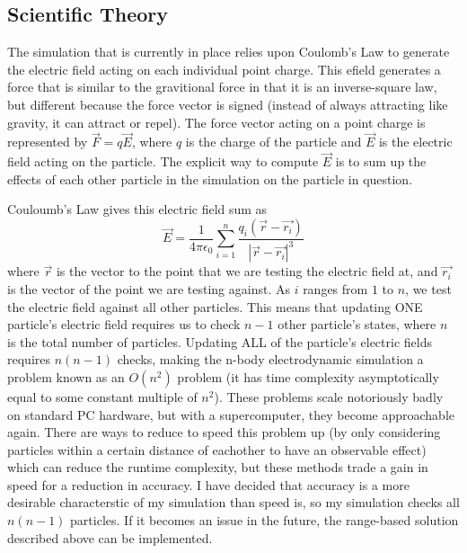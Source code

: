 \documentclass[10pt]{article}
\begin{document}
\clearpage
\subsection{Scientific Theory}
The simulation that is currently in place relies upon Coulomb's Law to generate the electric field acting on each individual point charge. This efield generates a force that is similar to the gravitional force in that it is an inverse-square law, but different because the force vector is signed (instead of always attracting like gravity, it can attract or repel). The force vector acting on a point charge is represented by $\vec{F} = q\vec{E}$, where $q$ is the charge of the particle and $\vec{E}$ is the electric field acting on the particle. The explicit way to compute $\vec{E}$ is to sum up the effects of each other particle in the simulation on the particle in question.

Couloumb's Law gives this electric field sum as $$\vec{E} = \frac{1}{4\pi\epsilon_0}\sum_{i = 1}^n \frac{q_i (\vec{r} - \vec{r_i})}{|\vec{r} - \vec{r_i}|^3}$$ where $\vec{r}$ is the vector to the point that we are testing the electric field at, and $\vec{r_i}$ is the vector of the point we are testing against. As $i$ ranges from $1$ to $n$, we test the electric field against all other particles. This means that updating ONE particle's electric field requires us to check $n-1$ other particle's states, where $n$ is the total number of particles. Updating ALL of the particle's electric fields requires $n(n-1)$ checks, making the n-body electrodynamic simulation a problem known as an $O(n^2)$ problem (it has time complexity asymptotically equal to some constant multiple of $n^2$). These problems scale notoriously badly on standard PC hardware, but with a supercomputer, they become approachable again. There are ways to reduce to speed this problem up (by only considering particles within a certain distance of eachother to have an observable effect) which can reduce the runtime complexity, but these methods trade a gain in speed for a reduction in accuracy. I have decided that accuracy is a more desirable characterstic of my simulation than speed is, so my simulation checks all $n(n-1)$ particles. If it becomes an issue in the future, the range-based solution described above can be implemented.
\end{document}
